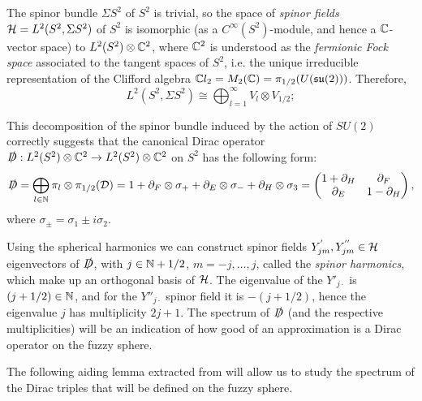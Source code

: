 The spinor bundle $\Sigma S^2$ of $S^2$ is trivial, so the space of \emph{spinor fields} $\mathcal H = L^2(S^2, \Sigma S^2)$ of $S^2$ is isomorphic (as a $C^\infty(S^2)$-module, and hence a $\mathbb{C}$-vector space) to $L^2(S^2) \otimes \mathbb{C}^2$, where $\mathbb{C}^2$ is understood as the \textit{fermionic Fock space} associated to the tangent spaces of $S^2$, i.e. the unique irreducible representation of the Clifford algebra $\mathbb{C} l_2 = M_2(\mathbb{C}) = \pi_{1/2}(U(\mathfrak{su}(2)))$. Therefore, 
\begin{equation}
L^2(S^2, \Sigma S^2) \cong \bigoplus_{l = 1}^\infty V_l \otimes V_{1/2};
\end{equation} 

\lin

This decomposition of the spinor bundle induced by the action of $SU(2)$ correctly suggests that the canonical Dirac operator $\slashed D: L^2(S^2)\otimes \mathbb{C}^2 \to L^2(S^2)\otimes \mathbb{C}^2$ on $S^2$ has the following form:
\begin{equation}\label{equationSU2InducedSeriesDiracSlashedAndMatrix}
    \textcolor{black}{\slashed D} =  \bigoplus_{l\in \mathbb{N}} \pi_l  \otimes \pi_{1/2}(\mathcal D) = 1 + \partial_F \otimes \sigma_+ + \partial_E \otimes \sigma_- + \partial_H \otimes \sigma_3 = \begin{pmatrix} 1 + \partial_H & \partial_F \\ \partial_E & 1 - \partial_H\end{pmatrix} ,
\end{equation}
where $\sigma_\pm = \sigma_1 \pm i \sigma_2$.

Using the spherical harmonics we can construct  spinor fields $Y^{'}_{jm}, Y^{''}_{jm} \in \mathcal H$ eigenvectors of $\slashed D$, with $j \in \mathbb{N} + 1/2$, $m = -j, \dots, j$, called the \textit{spinor harmonics}, which make up an orthogonal basis of $\mathcal H$. The eigenvalue of the $Y'_{j\cdot}$ is $(j + 1/2) \in \mathbb{N}$, and for the $Y{''}_{j\cdot}$ spinor field it is $-(j + 1/2)$, hence the eigenvalue $j$ has multiplicity $2j+1$. The spectrum of $\slashed D$ (and the respective multiplicities) will be an indication of how good of an approximation is a Dirac operator on the fuzzy sphere. 

The following aiding lemma extracted from \cite{DAndrea2013} will allow us to study the spectrum of the Dirac triples that will be defined on the fuzzy sphere.

